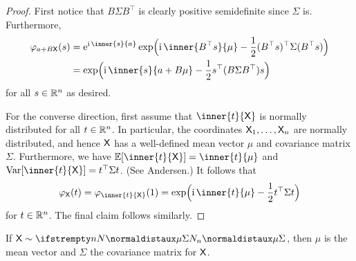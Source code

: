\documentclass[article, a4paper, 11pt, oneside]{memoir}
\numberwithin{equation}{chapter}
\newcommand{\trans}{\top}
\begin{document}
\begin{proof}
    First notice that $B \Sigma B^\trans$ is clearly positive semidefinite since $\Sigma$ is. Furthermore,
    \begin{align*}
        \phi_{a+B \rvar X}(s)
            &= \e^{\iu \inner{s}{a}} \exp \Bigl( \iu \inner{B^\trans s}{\mu} - \frac{1}{2} (B^\trans s)^\trans \Sigma (B^\trans s) \Bigr) \\
            &= \exp \Bigl( \iu \inner{s}{a + B\mu} - \frac{1}{2} s^\trans (B \Sigma B^\trans) s \Bigr)
    \end{align*}
    for all $s \in \mathbb{R}^n$ as desired.

    For the converse direction, first assume that $\inner{t}{\rvar X}$ is normally distributed for all $t \in \mathbb{R}^n$. In particular, the coordinates $\mathsf{X}_1, \ldots, \mathsf{X}_n$ are normally distributed, and hence $\mathsf{X}$ has a well-defined mean vector $\mu$ and covariance matrix $\Sigma$. Furthermore, we have $\mean{\inner{t}{\rvar X}} = \inner{t}{\mu}$ and $\var{\inner{t}{\rvar X}} = t^\trans \Sigma t$. (See Andersen.) It follows that
    \begin{equation*}
        \phi_{\rvar X}(t)
            = \phi_{\inner{t}{\rvar X}}(1)
            = \exp \Bigl( \iu \inner{t}{\mu} - \frac{1}{2} t^\trans \Sigma t \Bigr)
    \end{equation*}
    for $t \in \mathbb{R}^n$. The final claim follows similarly.
\end{proof}


\begin{corollary}
    If $\rvar X \dist \normaldist[n]{\mu}{\Sigma}$, then $\mu$ is the mean vector and $\Sigma$ the covariance matrix for $\mathsf{X}$.
\end{corollary}
\end{document}
